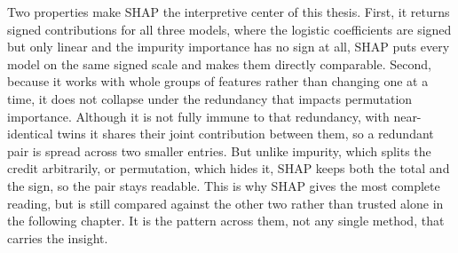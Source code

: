 Two properties make SHAP the interpretive center of this thesis. First, it returns
signed contributions for all three models, where the logistic coefficients are signed
but only linear and the impurity importance has no sign at all, SHAP puts every model
on the same signed scale and makes them directly comparable. Second, because
it works with whole groups of features rather than changing one at a time, it does not
collapse under the redundancy that impacts permutation importance. Although it is not fully
immune to that redundancy, with near-identical twins it shares their joint
contribution between them, so a redundant pair is spread across two smaller entries.
But unlike impurity, which splits the credit arbitrarily, or permutation, which
hides it, SHAP keeps both the total and the sign, so the pair stays readable. This is
why SHAP gives the most complete reading, but is still compared against the other
two rather than trusted alone in the following chapter. It is the pattern across 
them, not any single method, that carries the insight.